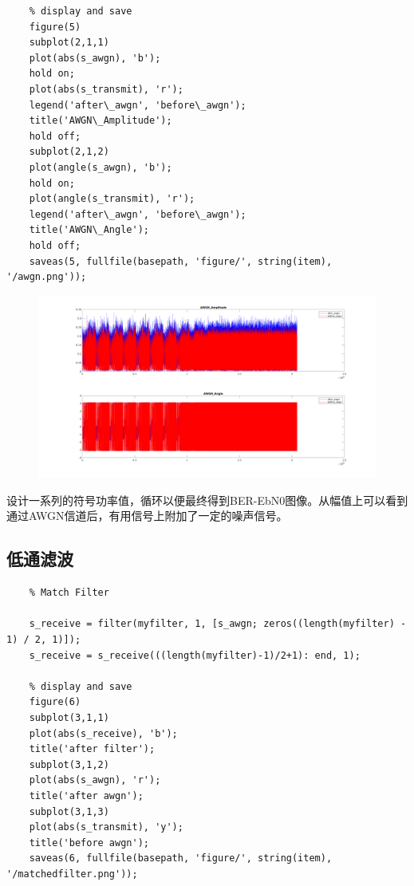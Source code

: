 \begin{spacing}{1.5}
\begin{lstlisting}
    % display and save
    figure(5)
    subplot(2,1,1)
    plot(abs(s_awgn), 'b');
    hold on;
    plot(abs(s_transmit), 'r');
    legend('after\_awgn', 'before\_awgn');
    title('AWGN\_Amplitude');
    hold off;
    subplot(2,1,2)
    plot(angle(s_awgn), 'b');
    hold on;
    plot(angle(s_transmit), 'r');
    legend('after\_awgn', 'before\_awgn');
    title('AWGN\_Angle');
    hold off;
    saveas(5, fullfile(basepath, 'figure/', string(item), '/awgn.png'));
\end{lstlisting}

\begin{figure}[H]
\centering
\includegraphics[width = \columnwidth]{awgn.png}
\end{figure}

设计一系列的符号功率值，循环以便最终得到BER-EbN0图像。从幅值上可以看到通过AWGN信道后，有用信号上附加了一定的噪声信号。

\subsection{低通滤波}

\begin{lstlisting}
    % Match Filter

    s_receive = filter(myfilter, 1, [s_awgn; zeros((length(myfilter) - 1) / 2, 1)]);
    s_receive = s_receive(((length(myfilter)-1)/2+1): end, 1);
    
    % display and save
    figure(6)
    subplot(3,1,1)
    plot(abs(s_receive), 'b');
    title('after filter');
    subplot(3,1,2)
    plot(abs(s_awgn), 'r');
    title('after awgn');
    subplot(3,1,3)
    plot(abs(s_transmit), 'y');
    title('before awgn');
    saveas(6, fullfile(basepath, 'figure/', string(item), '/matchedfilter.png'));
\end{lstlisting}


\end{spacing}
